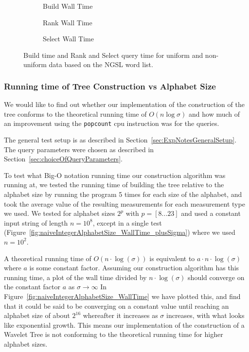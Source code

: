 \begin{figure}\tiny
	\begin{subfigure}{0.31\textwidth}
		
		\caption{Build Wall Time}
		\label{fig:UniformVsNonUniform_Build_WallTime}
	\end{subfigure}
	\hfill
	\begin{subfigure}{0.31\textwidth}
		
		\caption{Rank Wall Time}
		\label{fig:UniformVsNonUniform_Rank_WallTime}
	\end{subfigure}	
	\hfill
	\begin{subfigure}{0.31\textwidth}
		
		\caption{Select Wall Time}
		\label{fig:UniformVsNonUniform_Select_WallTime}
	\end{subfigure}
\caption{Build time and Rank and Select query time for uniform and non-uniform data based on the NGSL word list.}
\label{fig:UniformVsNonUniform}
\end{figure}

\subsubsection{Running time of Tree Construction vs Alphabet Size}

We would like to find out whether our implementation of the construction of the tree conforms to the theoretical running time of $O(n \log \sigma)$ and how much of an improvement using the \texttt{popcount} cpu instruction was for the queries.

The general test setup is as described in Section~\ref{sec:ExpNotesGeneralSetup}.
The query parameters were chosen as described in Section~\ref{sec:choiceOfQueryParameters}.

To test what Big-O notation running time our construction algorithm was running at, we tested the running time of building the tree relative to the alphabet size by running the program 5 times for each size of the alphabet, and took the average value of the resulting measurements for each measurement type we used.
We tested for alphabet sizes $2^p$ with $p = [8...23]$ and used a constant input string of length $n = 10^8$, except in a single test (Figure~\ref{fig:naiveIntegerAlphabetSize_WallTime_plusSigma}) where we used $n = 10^2$.

A theoretical running time of $O(n \cdot \log(\sigma))$ is equivalent to $a \cdot n \cdot \log(\sigma)$ where $a$ is some constant factor.
Assuming our construction algorithm has this running time, a plot of the wall time divided by $n \cdot \log(\sigma)$ should converge on the constant factor $a$ as $\sigma \rightarrow \infty$
In Figure~\ref{fig:naiveIntegerAlphabetSize_WallTime} we have plotted this, and find that it could be said to be converging on a constant value until reaching an alphabet size of about $2^{16}$ whereafter it increases as $\sigma$ increases, with what looks like exponential growth.
This means our implementation of the construction of a Wavelet Tree is not conforming to the theoretical running time for higher alphabet sizes.



